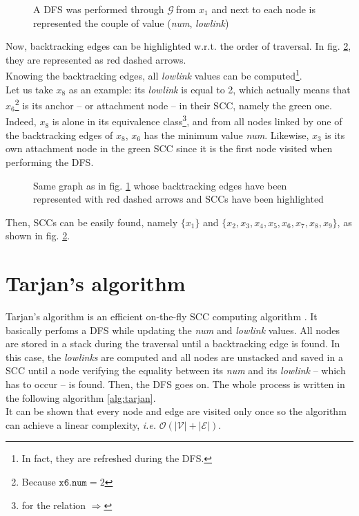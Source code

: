 \documentclass[a4 paper, 12pt]{article}
\def\GG{$\mathcal{G}~$}
\begin{document}
\begin{figure}[!h]
    \caption{A DFS was performed through \GG from $x_1$ and next to each node is represented the couple of value (\textit{num}, \textit{lowlink})\label{fig:exlowlink}}
\end{figure}

Now, backtracking edges can be highlighted w.r.t. the order of traversal. In fig. \ref{fig:exlowlink2}, they are represented as red dashed arrows.\\
Knowing the backtracking edges, all \textit{lowlink} values can be computed\footnote{In fact, they are refreshed during the DFS.}.\\
Let us take $x_8$ as an example: its \textit{lowlink} is equal to 2, which actually means that $x_6$\footnote{Because $\texttt{x6.num} = 2$} is its anchor -- or attachment node -- in their SCC, namely the green one. Indeed, $x_8$ is alone in its equivalence class\footnote{for the relation $\Rightarrow$}, and from all nodes linked by one of the backtracking edges of $x_8$, $x_6$ has the minimum value \textit{num}. Likewise, $x_3$ is its own attachment node in the green SCC since it is the first node visited when performing the DFS.

\begin{figure}[!h]
    \caption{Same graph as in fig. \ref{fig:exlowlink} whose backtracking edges have been represented with red dashed arrows and SCCs have been highlighted\label{fig:exlowlink2}}
\end{figure}

Then, SCCs can be easily found, namely $\{x_1\}$ and $\{x_2,x_3,x_4,x_5,x_6,x_7,x_8, x_9\}$, as shown in fig. \ref{fig:exlowlink2}.

\pagebreak
\section{Tarjan's algorithm}
Tarjan's algorithm is an efficient on-the-fly SCC computing algorithm \cite{tarjanMerz}. It basically perfoms a DFS while updating the \textit{num} and \textit{lowlink} values. All nodes are stored in a stack during the traversal until a backtracking edge is found. In this case, the \textit{lowlinks} are computed and all nodes are unstacked and saved in a SCC until a node verifying the equality between its \textit{num} and its \textit{lowlink} -- which has to occur -- is found. Then, the DFS goes on. The whole process is written in the following algorithm \ref{alg:tarjan}.\\
It can be shown that every node and edge are visited only once so the algorithm can achieve a linear complexity, \textit{i.e.} $\mathcal{O}(|\mathcal{V}|+|\mathcal{E}|)$.
\end{document}
